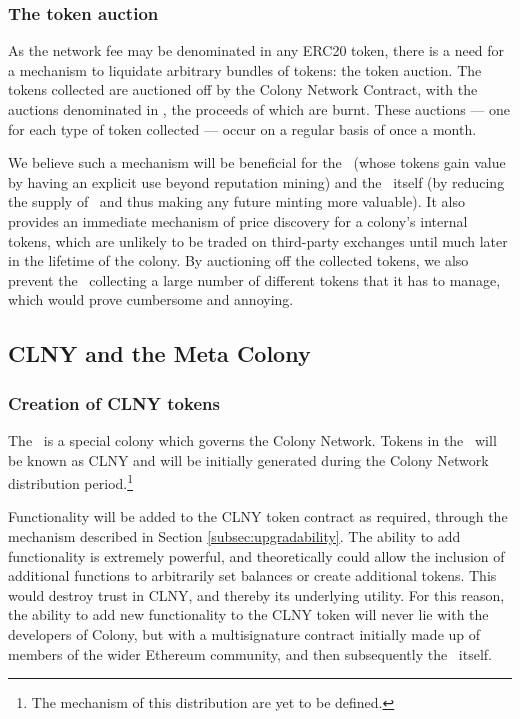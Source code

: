 \subsubsection{The token auction}

As the network fee may be denominated in any ERC20 token, there is a need for a mechanism to liquidate arbitrary bundles of tokens: the token auction. The tokens collected are auctioned off by the Colony Network Contract, with the auctions denominated in \rcts, the proceeds of which are burnt. These auctions --- one for each type of token collected --- occur on a regular basis of once a month.

We believe such a mechanism will be beneficial for the \rcths\ (whose tokens gain value by having an explicit use beyond reputation mining) and the \rc\ itself (by reducing the supply of \rcts\ and thus making any future minting more valuable). It also provides an immediate mechanism of price discovery for a colony's internal tokens, which are unlikely to be traded on third-party exchanges until much later in the lifetime of the colony. By auctioning off the collected tokens, we also prevent the \rc\ collecting a large number of different tokens that it has to manage, which would prove cumbersome and annoying.

\subsection{CLNY and the Meta Colony}\label{sec:clny}

\subsubsection{Creation of CLNY tokens}

The \rc\ is a special colony which governs the Colony Network. Tokens in the \rc\ will be known as CLNY and will be initially generated during the Colony Network distribution period.\footnote{The mechanism of this distribution are yet to be defined.}

Functionality will be added to the CLNY token contract as required, through the  mechanism described in Section  \ref{subsec:upgradability}. The ability to add functionality is extremely powerful, and theoretically could allow the inclusion of additional functions to arbitrarily set balances or create additional tokens. This would destroy trust in CLNY, and thereby its underlying utility. For this reason, the ability to add new functionality to the CLNY token will never lie with the developers of Colony, but with a multisignature contract initially made up of members of the wider Ethereum community, and then subsequently the \rc\ itself.

